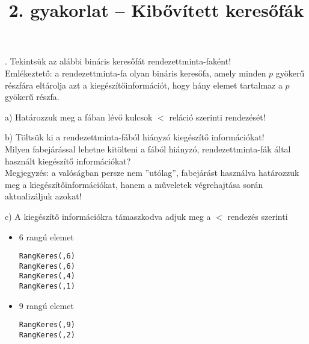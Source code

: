 \documentclass[12pt]{article}
\date{}
\title{2. gyakorlat -- Kibővített keresőfák}
\begin{document}
\maketitle

. Tekintsük az alábbi bináris keresőfát rendezettminta-faként!\\
Emlékeztető: a rendezettminta-fa olyan bináris keresőfa, amely minden $p$ gyökerű részfára eltárolja azt a kiegészítőinformációt, hogy hány elemet tartalmaz a $p$ gyökerű részfa.

\begin{figure}[!h]
\centering
\end{figure}

\noindent a) Határozzuk meg a fában lévő kulcsok $<$ reláció szerinti rendezését!

\noindent b) Töltsük ki a rendezettminta-fából hiányzó kiegészítő információkat!\\
Milyen fabejárással lehetne kitölteni a fából hiányzó, rendezettminta-fák által használt kiegészítő információkat? \\
Megjegyzés: a valóságban persze nem ''utólag'', fabejárást használva határozzuk meg a kiegészítőinformációkat, hanem a műveletek végrehajtása során aktualizáljuk azokat!

\noindent c) A kiegészítő információkra támaszkodva adjuk meg a $<$ rendezés szerinti

\begin{itemize}
\item 6 rangú elemet
\begin{alltt}
RangKeres(\aries, 6)
RangKeres(\taurus, 6)
RangKeres(\cancer, 4)
RangKeres(\libra, 1)
\end{alltt}

\item 9 rangú elemet
\begin{alltt}
RangKeres(\aries, 9)
RangKeres(\scorpio, 2)
\end{alltt}
\end{itemize}
\end{document}
